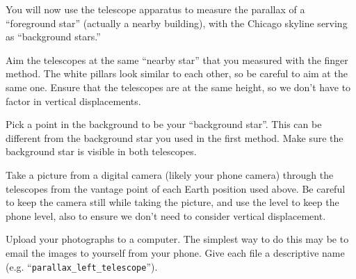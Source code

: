 You will now use the telescope apparatus to measure the parallax of a “foreground star”
(actually a nearby building), with the
Chicago skyline
serving as “background stars.”
\begin{steps}
    \item Aim the telescopes at the same ``nearby star'' that you measured with the finger method. The white pillars look similar to each other, so be careful to aim at the same one. Ensure that the telescopes are at the same height, so we don't have to factor in vertical displacements.
    
    \item Pick a point in the background to be your ``background star''. This can be different from the background star you used in the first method. Make sure the background star is visible in both telescopes.

    \item Take a picture from a digital camera (likely your phone camera) through the telescopes from the vantage point of each Earth position used above. Be careful to keep the camera still while taking the picture, and use the level to keep the phone level, also to ensure we don't need to consider vertical displacement.
	


	\item Upload your photographs to a computer. The simplest way to do this may be to email the images to yourself from your phone. Give each file a descriptive name (e.g. ``\texttt{parallax\_left\_telescope}'').
\end{steps}

